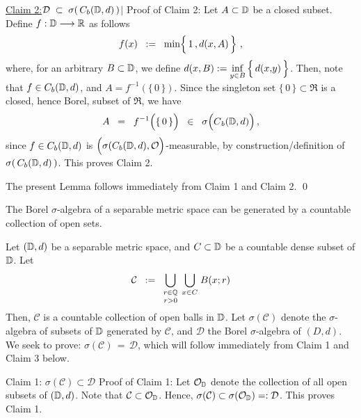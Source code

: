 \vskip 0.5cm
\noindent
\underline{Claim 2:\;\;$\mathcal{D} \;\subset\; \sigma\!\left(\,C_{b}(\mathbb{D},d)\,\right)${\color{white}$\vert$}}
\vskip 0.2cm
\noindent
Proof of Claim 2:\;\; Let $A \subset \mathbb{D}$ be a closed subset.
Define $f : \mathbb{D} \longrightarrow \mathbb{R}$ as follows
\begin{equation*}
f(x) \;\; := \;\; \min\!\left\{\,1\,\overset{{\color{white}\vert}}{,}\,d(x,A)\,\right\}\,,
\end{equation*}
where, for an arbitrary $B\subset\mathbb{D}$, we define
$d(x,B) := \underset{y \in B}{\inf}\left\{\,d(x\overset{{\color{white}\vert}}{,}y)\,\right\}$.
Then, note that $f \in C_{b}(\mathbb{D},d)$, and $A = f^{-1}(\{\,0\,\})$.
Since the singleton set $\{\,0\,\} \subset \Re$ is a closed, hence Borel, subset of $\Re$, we have
\begin{equation*}
A \;\; = \;\; f^{-1}\!\left(\{\,\overset{{\color{white}.}}{0}\,\}\right)
	\;\; \in \;\; \sigma\!\left(\overset{{\color{white}.}}{C}_{b}(\D,d)\right),
\end{equation*}
since $f \in C_{b}(\mathbb{D},d)$ is
$\left(\overset{{\color{white}-}}{\sigma}(C_{b}(\D,d),\mathcal{O}\right)$-measurable,
by construction/definition of $\sigma\!\left(\,C_{b}(\mathbb{D},d)\,\right)$.
This proves Claim 2.

\vskip 0.5cm
\noindent
The present Lemma follows immediately from Claim 1 and Claim 2.
\qed


\begin{lemma}
\mbox{}\vskip 0.1cm
\noindent
The Borel $\sigma$-algebra of a separable metric space can be generated by
a countable collection of open sets.
\end{lemma}
\proof
Let $(\mathbb{D},d)$ be a separable metric space, and $C \subset \mathbb{D}$ be a countable dense subset of $\mathbb{D}$.
Let
\begin{equation*}
\mathcal{C}
\;\; := \;\;
	\underset{r>0}{\underset{r\in\mathbb{Q}}{\bigcup}}\;\,
	\underset{x \in C}{\bigcup}\;
	B(x;r)
\end{equation*}
Then, $\mathcal{C}$ is a countable collection of open balls in $\mathbb{D}$.
Let $\sigma(\mathcal{C})$ denote the $\sigma$-algebra of subsets of $\mathbb{D}$ generated by $\mathcal{C}$,
and $\mathcal{D}$ the Borel $\sigma$-algebra of $(D,d)$.
We seek to prove: $\sigma(\mathcal{C}) \,=\, \mathcal{D}$, which will follow immediately from
Claim 1 and Claim 3 below.

\vskip 0.5cm
\noindent
Claim 1:\;\; $\sigma(\mathcal{C}) \subset \mathcal{D}$
\vskip 0.1cm
\noindent
Proof of Claim 1:\;
Let $\mathcal{O}_{\mathbb{D}}$ denote the collection of all open subsets of $(\mathbb{D},d)$.
Note that $\mathcal{C} \subset \mathcal{O}_{\mathbb{D}}$.
Hence, $\sigma(\mathcal{C}) \subset \sigma(\mathcal{O}_{\mathbb{D}}) =: \mathcal{D}$.
This proves Claim 1.


